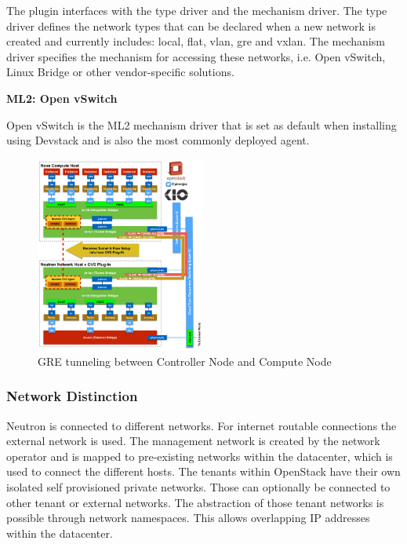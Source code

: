 The plugin interfaces with the type driver and the mechanism driver. The type driver defines the network types that can be declared when a new network is created and currently includes: local, flat, vlan, gre and vxlan. The mechanism driver specifies the mechanism for accessing these networks, i.e. Open vSwitch, Linux Bridge or other vendor-specific solutions. 



\textbf{ML2: Open vSwitch}

Open vSwitch is the ML2 mechanism driver that is set as default when installing using Devstack and is also the most commonly deployed agent.

\begin{figure}[H]
\centering
\includegraphics[width=0.5\textwidth]{images/fundamentals/neutron_gre_connection_nodes.jpg}
\caption{GRE tunneling between Controller Node and Compute Node}
\end{figure}

\subsubsection{Network Distinction}

Neutron is connected to different networks. For internet routable connections the external network is used. The management network is created by the network operator and is mapped to pre-existing networks within the datacenter, which is used to connect the different hosts. The tenants within OpenStack have their own isolated self provisioned private networks. Those can optionally be connected to other tenant or external networks. The abstraction of those tenant networks is possible through network namespaces. This allows overlapping IP addresses within the datacenter.



